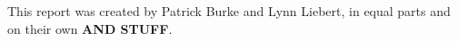 This report was created by Patrick Burke and Lynn Liebert, in equal parts and on their own \textbf{AND STUFF}.


